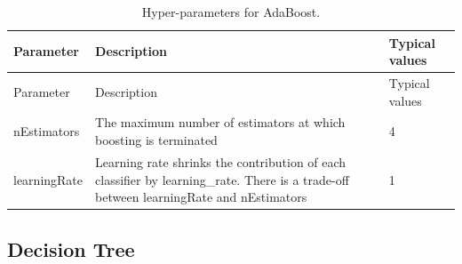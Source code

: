 \documentclass[11pt]{book}
\theoremstyle{definition}
\theoremstyle{definition}
\theoremstyle{definition}
\theoremstyle{remark}
\begin{document}
\begin{longtable}[]{@{}lll@{}}
\caption{\label{tab:adaBoostParameters} Hyper-parameters for
AdaBoost.}\tabularnewline
\toprule
\begin{minipage}[b]{0.13\columnwidth}\raggedright\strut
Parameter\strut
\end{minipage} & \begin{minipage}[b]{0.16\columnwidth}\raggedright\strut
Description\strut
\end{minipage} & \begin{minipage}[b]{0.20\columnwidth}\raggedright\strut
Typical values\strut
\end{minipage}\tabularnewline
\midrule
\endfirsthead
\toprule
\begin{minipage}[b]{0.13\columnwidth}\raggedright\strut
Parameter\strut
\end{minipage} & \begin{minipage}[b]{0.16\columnwidth}\raggedright\strut
Description\strut
\end{minipage} & \begin{minipage}[b]{0.20\columnwidth}\raggedright\strut
Typical values\strut
\end{minipage}\tabularnewline
\midrule
\endhead
\begin{minipage}[t]{0.13\columnwidth}\raggedright\strut
nEstimators\strut
\end{minipage} & \begin{minipage}[t]{0.16\columnwidth}\raggedright\strut
The maximum number of estimators at which boosting is terminated\strut
\end{minipage} & \begin{minipage}[t]{0.20\columnwidth}\raggedright\strut
4\strut
\end{minipage}\tabularnewline
\begin{minipage}[t]{0.13\columnwidth}\raggedright\strut
learningRate\strut
\end{minipage} & \begin{minipage}[t]{0.16\columnwidth}\raggedright\strut
Learning rate shrinks the contribution of each classifier by
learning\_rate. There is a trade-off between learningRate and
nEstimators\strut
\end{minipage} & \begin{minipage}[t]{0.20\columnwidth}\raggedright\strut
1\strut
\end{minipage}\tabularnewline
\bottomrule
\end{longtable}

\subsection{Decision Tree}\label{decision-tree}
\end{document}
